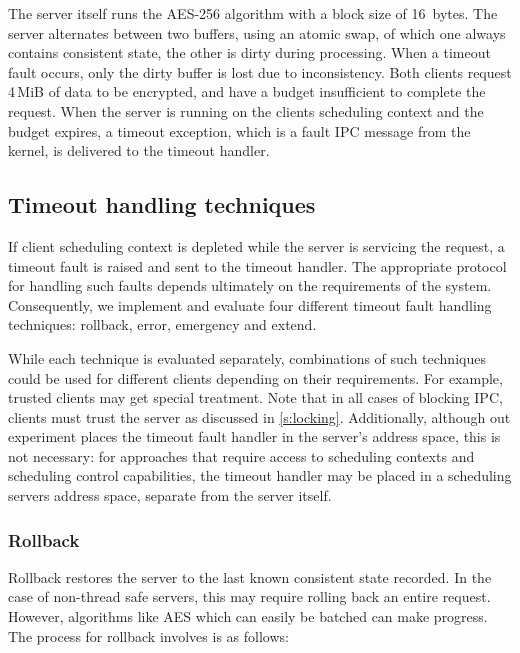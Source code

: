 The server itself runs the AES-256 algorithm with a block size of 16~bytes. The server alternates between two
buffers, using an atomic swap, of which one always contains consistent state, the other is
dirty during processing. When a timeout fault occurs, only the dirty buffer is lost due to
inconsistency. Both clients request 4\,MiB of data to be encrypted, and have a budget insufficient to
complete the request. When the server is running on the clients scheduling context and the budget
expires, a timeout exception, which is a fault IPC message from the kernel, is delivered to the timeout
handler. 

\subsection{Timeout handling techniques}

If client scheduling context is depleted while the server is servicing the request, a timeout fault
is raised and sent to the timeout handler.  The appropriate protocol for handling such faults
depends ultimately on the requirements of the system.  Consequently, we implement and evaluate four
different timeout fault handling techniques: rollback, error, emergency and extend. 

While each technique is evaluated separately, combinations of such techniques could be used for
different clients depending on their requirements. For example, trusted clients may get special
treatment. Note that in all cases of blocking IPC, clients must trust the server as discussed in
\cref{s:locking}. Additionally, although out experiment places 
the timeout fault handler in the server's address
space, this is not necessary: for approaches that require access to scheduling contexts and
scheduling control capabilities, the timeout handler may be placed in a scheduling servers address
space, separate from the server itself.

\subsubsection{Rollback}

Rollback restores the server to the last known consistent state recorded. In the case of non-thread
safe servers, this may require rolling back an entire request. However, algorithms like \gls{AES}
which can easily be batched can make progress. The process for rollback involves is as follows:

